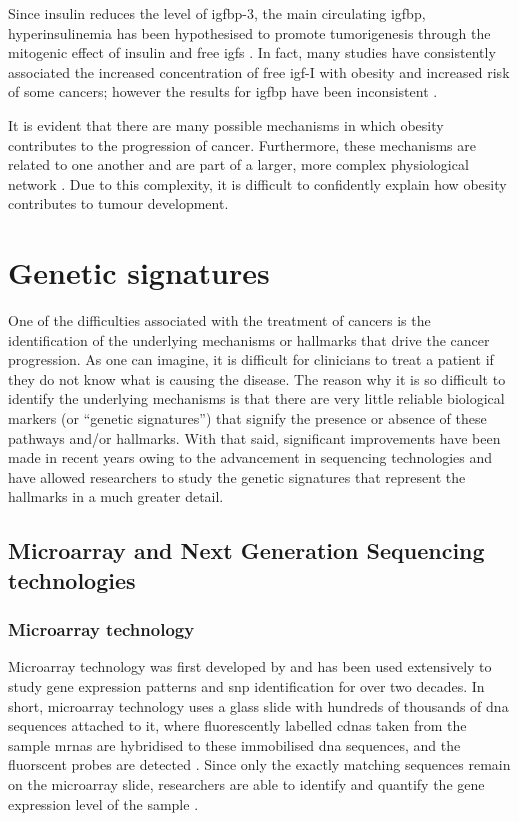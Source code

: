 Since insulin reduces the level of \gls{igfbp}-3, the main circulating \gls{igfbp}, hyperinsulinemia has been hypothesised to promote tumorigenesis through the mitogenic effect of insulin and free \glspl{igf} \citep{Giovannucci1995,Mckeown1994,Roberts2010}.
In fact, many studies have consistently associated the increased concentration of free \gls{igf}-I with obesity and increased risk of some cancers; however the results for \gls{igfbp} have been inconsistent \citep{Basen2011}.

It is evident that there are many possible mechanisms in which obesity contributes to the progression of cancer.
Furthermore, these mechanisms are related to one another and are part of a larger, more complex physiological network \citep{Renehan2006}.
Due to this complexity, it is difficult to confidently explain how obesity contributes to tumour development.

\section{Genetic signatures}
\label{sec:genetic_signatures}

One of the difficulties associated with the treatment of cancers is the identification of the underlying mechanisms or hallmarks that drive the cancer progression.
As one can imagine, it is difficult for clinicians to treat a patient if they do not know what is causing the disease.
The reason why it is so difficult to identify the underlying mechanisms is that there are very little reliable biological markers (or ``genetic signatures'') that signify the presence or absence of these pathways and/or hallmarks.
With that said, significant improvements have been made in recent years owing to the advancement in sequencing technologies and have allowed researchers to study the genetic signatures that represent the hallmarks in a much greater detail.

\subsection{Microarray and Next Generation Sequencing technologies}
\label{sub:microarray_and_next_generation_sequencing_technologies}

\subsubsection{Microarray technology}
\label{ssub:microarray_technology}

Microarray technology was first developed by \citet{Schena1995} and has been used extensively to study gene expression patterns and \gls{snp} identification for over two decades.
In short, microarray technology uses a glass slide with hundreds of thousands of \acrshort{dna} sequences attached to it, where fluorescently labelled \glspl{cdna} taken from the sample \glspl{mrna} are hybridised to these immobilised \acrshort{dna} sequences, and the fluorscent probes are detected \citep{Schena1995,Schulze2001}.
Since only the exactly matching sequences remain on the microarray slide, researchers are able to identify and quantify the gene expression level of the sample \citep{Schulze2001}.

